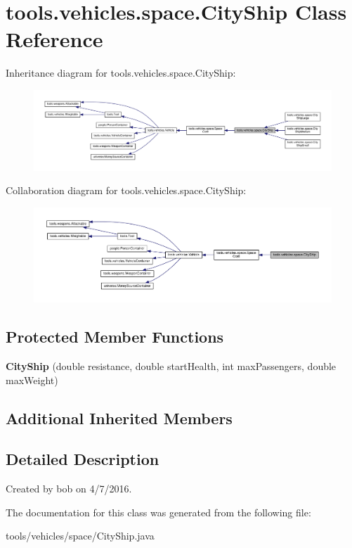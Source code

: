 \hypertarget{classtools_1_1vehicles_1_1space_1_1_city_ship}{}\section{tools.\+vehicles.\+space.\+City\+Ship Class Reference}
\label{classtools_1_1vehicles_1_1space_1_1_city_ship}


Inheritance diagram for tools.\+vehicles.\+space.\+City\+Ship\+:
\nopagebreak
\begin{figure}[H]
\begin{center}
\leavevmode
\includegraphics[width=350pt]{classtools_1_1vehicles_1_1space_1_1_city_ship__inherit__graph}
\end{center}
\end{figure}


Collaboration diagram for tools.\+vehicles.\+space.\+City\+Ship\+:
\nopagebreak
\begin{figure}[H]
\begin{center}
\leavevmode
\includegraphics[width=350pt]{classtools_1_1vehicles_1_1space_1_1_city_ship__coll__graph}
\end{center}
\end{figure}
\subsection*{Protected Member Functions}
\begin{DoxyCompactItemize}
\item 
{\bfseries City\+Ship} (double resistance, double start\+Health, int max\+Passengers, double max\+Weight)\hypertarget{classtools_1_1vehicles_1_1space_1_1_city_ship_a62a5f5ef6a05f7d94513a3587ac3f536}{}\label{classtools_1_1vehicles_1_1space_1_1_city_ship_a62a5f5ef6a05f7d94513a3587ac3f536}

\end{DoxyCompactItemize}
\subsection*{Additional Inherited Members}


\subsection{Detailed Description}
Created by bob on 4/7/2016. 

The documentation for this class was generated from the following file\+:\begin{DoxyCompactItemize}
\item 
tools/vehicles/space/City\+Ship.\+java\end{DoxyCompactItemize}
